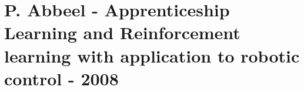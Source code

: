 \section{P. Abbeel - Apprenticeship Learning and Reinforcement learning with application to robotic control - 2008}